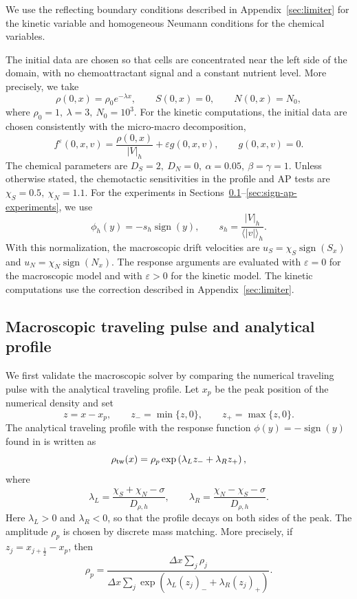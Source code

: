 \documentclass[11pt,twoside]{article}
\numberwithin{equation}{section}
\theoremstyle{plain}
\theoremstyle{nonumberplain}
\begin{document}
{{We use the reflecting boundary conditions described in
Appendix~\ref{sec:limiter} for the kinetic variable and
homogeneous Neumann conditions for the chemical variables.


The initial data are chosen so that cells are concentrated near the left
side of the domain, with no chemoattractant signal and a constant
nutrient level. More precisely, we take
\[
\rho(0,x)=\rho_0 e^{-\lambda x},
\qquad
S(0,x)=0,
\qquad
N(0,x)=N_0,
\]
where
$\rho_0=1,
\
\lambda=3,
\
N_0=10^3 .$
For the kinetic computations, the initial data are chosen consistently
with the micro-macro decomposition,
\[
f^\varepsilon(0,x,v)
=
\frac{\rho(0,x)}{|V|_h}
+
\varepsilon g(0,x,v),
\qquad
g(0,x,v)=0 .
\]
The chemical parameters are
$
D_S=2,
\
D_N=0,
\
\alpha=0.05,
\
\beta=\gamma=1 .
$
Unless otherwise stated, the chemotactic sensitivities in the profile
and AP tests are
$\chi_S=0.5,
\
\chi_N=1.1 .$
For the experiments in
Sections~\ref{sec:macro-validation}--\ref{sec:sign-ap-experiments},
we use
\[
\phi_h(y)=-s_h\operatorname{sign}(y),
\qquad
s_h=\frac{|V|_h}{\langle|v|\rangle_h}.
\]
With this normalization, the macroscopic drift velocities are
$u_S=\chi_S\operatorname{sign}(S_x)$ and
$u_N=\chi_N\operatorname{sign}(N_x)$.
The response arguments are evaluated with $\varepsilon=0$
for the macroscopic model and with $\varepsilon>0$ for the kinetic model.
The kinetic computations use the correction described in Appendix~\ref{sec:limiter}.


\subsection{Macroscopic traveling pulse and analytical profile}
\label{sec:macro-validation}

We first validate the macroscopic solver by comparing the numerical
traveling pulse with the analytical traveling profile. Let
\(x_p\) be the peak position of the numerical density and set
\[
z=x-x_p,
\qquad
z_-=\min\{z,0\},
\qquad
z_+=\max\{z,0\}.
\]
The analytical traveling profile with the response function $\phi(y)=-\operatorname{sign}(y)$ found in \cite{calvez2019chemotactic} is written as 
\begin{equation}
\rho_{\rm tw}(x)
=
\rho_p
\exp\left(
\lambda_L z_-
+
\lambda_R z_+
\right),
\label{eq:analytic-sol}
\end{equation}
where
\[
\lambda_L
=
\frac{\chi_S+\chi_N-\sigma}{D_{\rho,h}},
\qquad
\lambda_R
=
\frac{\chi_N-\chi_S-\sigma}{D_{\rho,h}} .
\]
Here \(\lambda_L>0\) and \(\lambda_R<0\), so that the profile decays on
both sides of the peak. The amplitude \(\rho_p\) is chosen by discrete
mass matching. More precisely, if \(z_j=x_{j+\frac12}-x_p\), then
\[
\rho_p
=
\frac{
\Delta x\sum_j \rho_j
}{
\Delta x\sum_j
\exp\left(
\lambda_L (z_j)_-
+
\lambda_R (z_j)_+
\right)
}.
\]

}}
\end{document}
